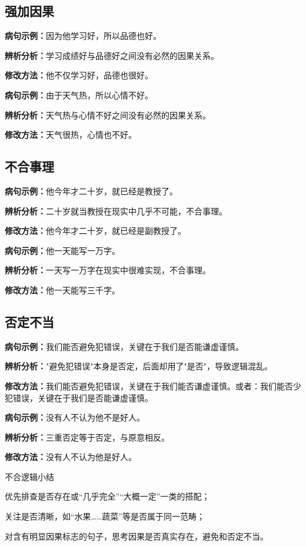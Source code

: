 \documentclass[a4paper,12pt]{ctexrep}
\newcommand{\exampleicon}{\textcolor{highlight}{\faExclamationTriangle}}
\newcommand{\analysisicon}{\textcolor{accent}{\faSearch}}
\newcommand{\revisionicon}{\textcolor{secondary}{\faCheckCircle}}
\begin{document}
\subsection{强加因果}
\exampleicon \textbf{病句示例：}因为他学习好，所以品德也好。

\analysisicon \textbf{辨析分析：}学习成绩好与品德好之间没有必然的因果关系。

\revisionicon \textbf{修改方法：}他不仅学习好，品德也很好。

\exampleicon \textbf{病句示例：}由于天气热，所以心情不好。

\analysisicon \textbf{辨析分析：}天气热与心情不好之间没有必然的因果关系。

\revisionicon \textbf{修改方法：}天气很热，心情也不好。

\subsection{不合事理}
\exampleicon \textbf{病句示例：}他今年才二十岁，就已经是教授了。

\analysisicon \textbf{辨析分析：}二十岁就当教授在现实中几乎不可能，不合事理。

\revisionicon \textbf{修改方法：}他今年才二十岁，就已经是副教授了。

\exampleicon \textbf{病句示例：}他一天能写一万字。

\analysisicon \textbf{辨析分析：}一天写一万字在现实中很难实现，不合事理。

\revisionicon \textbf{修改方法：}他一天能写三千字。

\subsection{否定不当}
\exampleicon \textbf{病句示例：}我们能否避免犯错误，关键在于我们是否能谦虚谨慎。

\analysisicon \textbf{辨析分析：}"避免犯错误"本身是否定，后面却用了"是否"，导致逻辑混乱。

\revisionicon \textbf{修改方法：}我们能否避免犯错误，关键在于我们能否谦虚谨慎。或者：我们能否少犯错误，关键在于我们是否能谦虚谨慎。

\exampleicon \textbf{病句示例：}没有人不认为他不是好人。

\analysisicon \textbf{辨析分析：}三重否定等于否定，与原意相反。

\revisionicon \textbf{修改方法：}没有人不认为他是好人。

\begin{summarybox}{不合逻辑小结}
\begin{focuspoints}
  \item 优先排查是否存在或“几乎完全”“大概一定”一类的搭配；
  \item 关注是否清晰，如“水果……蔬菜”等是否属于同一范畴；
  \item 对含有明显因果标志的句子，思考因果是否真实存在，避免和否定不当。
\end{focuspoints}
\end{summarybox}
\end{document}
